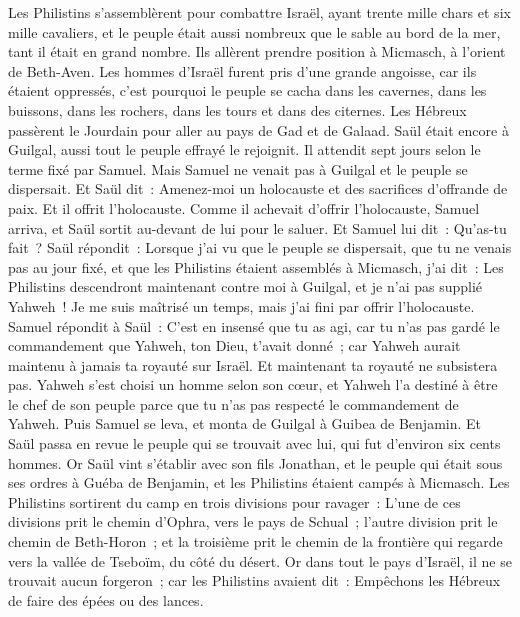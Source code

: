 \begin{multicols}{2}
Les Philistins s'assemblèrent pour combattre Israël, ayant trente mille chars et six mille cavaliers, et le peuple était aussi nombreux que le sable au bord de la mer, tant il était en grand nombre. Ils allèrent prendre position à Micmasch, à l'orient de Beth-Aven.
Les hommes d'Israël furent pris d'une grande angoisse, car ils étaient oppressés, c'est pourquoi le peuple se cacha dans les cavernes, dans les buissons, dans les rochers, dans les tours et dans des citernes.
Les Hébreux passèrent le Jourdain pour aller au pays de Gad et de Galaad. Saül était encore à Guilgal, aussi tout le peuple effrayé le rejoignit.
Il attendit sept jours selon le terme fixé par Samuel. Mais Samuel ne venait pas à Guilgal et le peuple se dispersait.
Et Saül dit~: Amenez-moi un holocauste et des sacrifices d'offrande de paix. Et il offrit l'holocauste.
Comme il achevait d'offrir l'holocauste, Samuel arriva, et Saül sortit au-devant de lui pour le saluer.
Et Samuel lui dit~: Qu'as-tu fait~? Saül répondit~: Lorsque j'ai vu que le peuple se dispersait, que tu ne venais pas au jour fixé, et que les Philistins étaient assemblés à Micmasch,
j'ai dit~: Les Philistins descendront maintenant contre moi à Guilgal, et je n'ai pas supplié Yahweh~! Je me suis maîtrisé un temps, mais j'ai fini par offrir l'holocauste.
Samuel répondit à Saül~: C'est en insensé que tu as agi, car tu n'as pas gardé le commandement que Yahweh, ton Dieu, t'avait donné~; car Yahweh aurait maintenu à jamais ta royauté sur Israël.
Et maintenant ta royauté ne subsistera pas. Yahweh s'est choisi un homme selon son cœur, et Yahweh l'a destiné à être le chef de son peuple parce que tu n'as pas respecté le commandement de Yahweh.
Puis Samuel se leva, et monta de Guilgal à Guibea de Benjamin. Et Saül passa en revue le peuple qui se trouvait avec lui, qui fut d'environ six cents hommes.
Or Saül vint s'établir avec son fils Jonathan, et le peuple qui était sous ses ordres à Guéba de Benjamin, et les Philistins étaient campés à Micmasch.
Les Philistins sortirent du camp en trois divisions pour ravager~: L'une de ces divisions prit le chemin d'Ophra, vers le pays de Schual~;
l'autre division prit le chemin de Beth-Horon~; et la troisième prit le chemin de la frontière qui regarde vers la vallée de Tseboïm, du côté du désert.
Or dans tout le pays d'Israël, il ne se trouvait aucun forgeron~; car les Philistins avaient dit~: Empêchons les Hébreux de faire des épées ou des lances.

\end{multicols}
